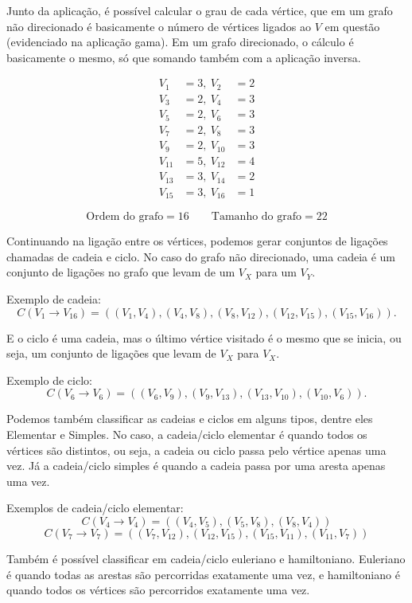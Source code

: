 	Junto da aplicação, é possível calcular o grau de cada vértice, que em um grafo não direcionado é basicamente o número de vértices ligados ao $V$ em questão (evidenciado na aplicação gama).
	Em um grafo direcionado, o cálculo é basicamente o mesmo, só que somando também com a aplicação inversa.
	
	\[
	\begin{aligned}
		V_1 &= 3, \
		V_2 &= 2 \\
		V_3 &= 2, \
		V_4 &= 3 \\
		V_5 &= 2, \
		V_6 &= 3 \\
		V_7 &= 2, \
		V_8 &= 3 \\
		V_9 &= 2, \
		V_{10} &= 3 \\
		V_{11} &= 5, \
		V_{12} &= 4 \\
		V_{13} &= 3,\
		V_{14} &= 2 \\
		V_{15} &= 3,\
		V_{16} &= 1
	\end{aligned}
	\]
	
	\[
	\text{Ordem do grafo} = 16 \qquad \text{Tamanho do grafo} = 22
	\]
	
	Continuando na ligação entre os vértices, podemos gerar conjuntos de ligações chamadas de cadeia e ciclo.
	No caso do grafo não direcionado, uma cadeia é um conjunto de ligações no grafo que levam de um $V_X$ para um $V_Y$.
	
	Exemplo de cadeia:
	\[
	C(V_1 \rightarrow V_{16}) = ((V_1,V_4),(V_4,V_8),(V_8,V_{12}),(V_{12},V_{15}),(V_{15},V_{16})).
	\]
	
	E o ciclo é uma cadeia, mas o último vértice visitado é o mesmo que se inicia, ou seja, um conjunto de ligações que levam de $V_X$ para $V_X$.
	
	Exemplo de ciclo:
	\[
	C(V_6 \rightarrow V_6) = ((V_6,V_9),(V_9,V_{13}),(V_{13},V_{10}),(V_{10},V_6)).
	\]
	
	Podemos também classificar as cadeias e ciclos em alguns tipos, dentre eles Elementar e Simples.
	No caso, a cadeia/ciclo elementar é quando todos os vértices são distintos, ou seja, a cadeia ou ciclo passa pelo vértice apenas uma vez.
	Já a cadeia/ciclo simples é quando a cadeia passa por uma aresta apenas uma vez.
	
	Exemplos de cadeia/ciclo elementar:
	\[
	C(V_4 \rightarrow V_4) = ((V_4,V_5),(V_5,V_8),(V_8,V_4))
	\]
	\[
	C(V_7 \rightarrow V_7) = ((V_7,V_{12}),(V_{12},V_{15}),(V_{15},V_{11}),(V_{11},V_7))
	\]
	
	Também é possível classificar em cadeia/ciclo euleriano e hamiltoniano.
	Euleriano é quando todas as arestas são percorridas exatamente uma vez, e hamiltoniano é quando todos os vértices são percorridos exatamente uma vez.
	
